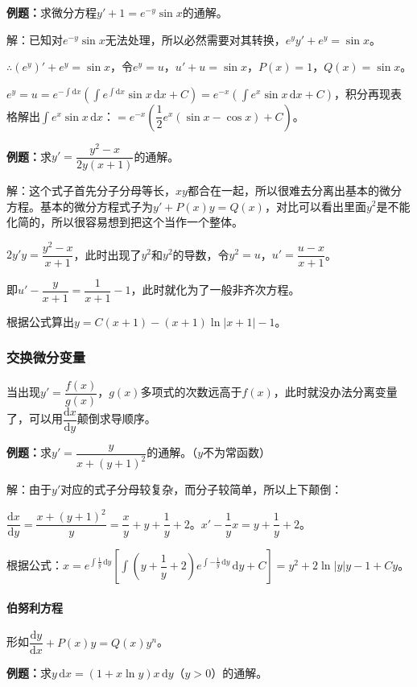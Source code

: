 \textbf{例题：}求微分方程$y'+1=e^{-y}\sin x$的通解。

解：已知对$e^{-y}\sin x$无法处理，所以必然需要对其转换，$e^yy'+e^y=\sin x$。

$\therefore(e^y)'+e^y=\sin x$，令$e^y=u$，$u'+u=\sin x$，$P(x)=1$，$Q(x)=\sin x$。

$e^y=u=e^{-\int\textrm{d}x}(\int e^{\int\textrm{d}x}\sin x\,\textrm{d}x+C)=e^{-x}(\int e^x\sin x\,\textrm{d}x+C)$，积分再现表格解出$\int e^x\sin x\,\textrm{d}x$：$=e^{-x}\left(\dfrac{1}{2}e^x(\sin x-\cos x)+C\right)$。

\textbf{例题：}求$y'=\dfrac{y^2-x}{2y(x+1)}$的通解。

解：这个式子首先分子分母等长，$xy$都合在一起，所以很难去分离出基本的微分方程。基本的微分方程式子为$y'+P(x)y=Q(x)$，对比可以看出里面$y^2$是不能化简的，所以很容易想到把这个当作一个整体。

$2y'y=\dfrac{y^2-x}{x+1}$，此时出现了$y^2$和$y^2$的导数，令$y^2=u$，$u'=\dfrac{u-x}{x+1}$。

即$u'-\dfrac{y}{x+1}=\dfrac{1}{x+1}-1$，此时就化为了一般非齐次方程。

根据公式算出$y=C(x+1)-(x+1)\ln\vert x+1\vert-1$。

\subsubsection{交换微分变量}

当出现$y'=\dfrac{f(x)}{g(x)}$，$g(x)$多项式的次数远高于$f(x)$，此时就没办法分离变量了，可以用$\dfrac{\textrm{d}x}{\textrm{d}y}$颠倒求导顺序。

\textbf{例题：}求$y'=\dfrac{y}{x+(y+1)^2}$的通解。（$y$不为常函数）

解：由于$y'$对应的式子分母较复杂，而分子较简单，所以上下颠倒：

$\dfrac{\textrm{d}x}{\textrm{d}y}=\dfrac{x+(y+1)^2}{y}=\dfrac{x}{y}+y+\dfrac{1}{y}+2$。$x'-\dfrac{1}{y}x=y+\dfrac{1}{y}+2$。

根据公式：$x=e^{\int\frac{1}{y}\,\textrm{d}y}\left[\displaystyle{\int\left(y+\dfrac{1}{y}+2\right)}e^{\int-\frac{1}{y}\,\textrm{d}y}\,\textrm{d}y+C\right]=y^2+2\ln\vert y\vert y-1+Cy$。

\paragraph{伯努利方程}

形如$\dfrac{\textrm{d}y}{\textrm{d}x}+P(x)y=Q(x)y^n$。

\textbf{例题：}求$y\,\textrm{d}x=(1+x\ln y)x\,\textrm{d}y$（$y>0$）的通解。

